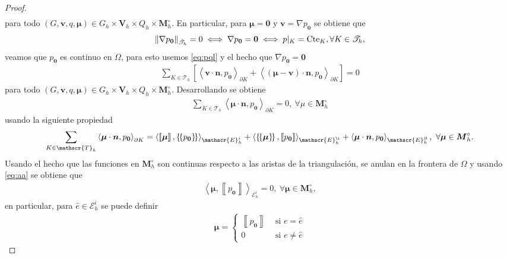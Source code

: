 \documentclass[10pt,a4paper]{report}
\newcommand{\bs}{\boldsymbol}
\newcommand{\Th}{\mathscr{T}_{h}}
\providecommand{\norm}[1]{\left\lVert#1\right\rVert}
\providecommand{\salto}[1]{\left\llbracket#1\right\rrbracket}
\providecommand{\prom}[1]{\left \{\!\left \{#1\right \}\!\right \}}
\providecommand{\PI}[2]{\left\langle #1,#2  \right\rangle}
\begin{document}
\begin{proof}
\begin{align}
    \end{align}
    para todo $\left(G,\bs{v},q,\bs{\mu}\right)\in G_{h}\times\bs{V}_{h}\times Q_{h}\times \bs{M}^{\circ}_{h}$. En particular, para $\bs{\mu} = \bs{0}$ y $\bs{v} = \nabla p_{\bs{0}}$ se obtiene que
    \begin{align*}
    	\norm{\nabla p_{\bs{0}}}_{\Th} = 0 \iff  \nabla p_{\bs{0}} = \bs{0} \iff p|_{K} = \textup{Cte}_{K}, \forall K\in \Th,
    \end{align*}
    veamos que $p_{\bs{0}}$ es continuo en $\Omega$, para esto usemos \eqref{eq:pql} y el hecho que $ \nabla p_{\bs{0}} = \bs{0}$
    \begin{align*}
    	\sum_{K\in\Th}\left[ \PI{\bs{v}\cdot\bs{n}}{p_{\bs{0}}}_{\partial K} + \PI{\left(\bs{\mu} - \bs{v}\right)\cdot\bs{n}}{p_{\bs{0}}}_{\partial K} \right] = 0
    \end{align*}
    para todo $\left(G,\bs{v},q,\bs{\mu}\right)\in G_{h}\times\bs{V}_{h}\times Q_{h}\times \bs{M}^{\circ}_{h}$. Desarrollando se obtiene
    \begin{align}\label{eq:aa}
    	\sum_{K\in\Th} \PI{\bs{\mu} \cdot\bs{n}}{p_{\bs{0}}}_{\partial K}  = 0, \ \forall \mu\in \bs{M}^{\circ}_{h}
    \end{align} 
    usando la siguiente propiedad
    \begin{align*}
    	\sum_{K\in\Th} \PI{\bs{\mu} \cdot\bs{n}}{p_{\bs{0}}}_{\partial K} = \PI{\salto{\bs{\mu}}}{\prom{p_{\bs{0}}}}_{\mathscr{E}^{i}_{h}} + \PI{\prom{\bs{\mu}}}{\salto{p_{\bs{0}}}}_{\mathscr{E}^{\i}_{h}}  + \PI{\bs{\mu}\cdot\bs{n}}{p_{\bs{0}}}_{\mathscr{E}^{\partial}_{h}},  \ \forall \bs{\mu}\in \bs{M}^{\circ}_{h}.
    \end{align*}
    Usando el hecho que las funciones en $\bs{M}^{\circ}_{h}$ son continuas respecto a las aristas de la triangulación, se anulan en la frontera de $\Omega$ y usando \eqref{eq:aa} se obtiene que 
    \begin{align*}
    	\PI{\bs{\mu}}{\salto{p_{\bs{0}}}}_{\mathscr{E}^{i}_{h}} = 0,\ \forall \bs{\mu}\in \bs{M}^{\circ}_{h},
    \end{align*} 
    en particular, para $\hat{e}\in \mathscr{E}^{i}_{h}$ se puede definir
    \begin{align*}
    	\bs{\mu} = \begin{cases}
    		\salto{p_{\bs{0}}}& \text{ si } e = \hat{e} \\ 
    		0 & \text{ si } e \neq \hat{e} 
    	\end{cases}
    \end{align*}

\end{proof}
\end{document}
